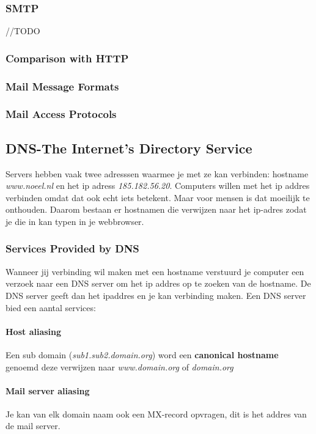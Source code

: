 \subsubsection{SMTP}
//TODO
\subsubsection{Comparison with HTTP}

\subsubsection{Mail Message Formats}

\subsubsection{Mail Access Protocols}

\subsection{DNS-The Internet's Directory Service}
Servers hebben vaak twee adresssen waarmee je met ze kan verbinden: hostname \textit{www.noeel.nl} en het ip adress \textit{185.182.56.20}. Computers willen met het ip addres verbinden omdat dat ook echt iets betekent. Maar voor mensen is dat moeilijk te onthouden. Daarom bestaan er hostnamen die verwijzen naar het ip-adres zodat je die in kan typen in je webbrowser.
\subsubsection{Services Provided by DNS}
Wanneer jij verbinding wil maken met een hostname verstuurd je computer een verzoek naar een DNS server om het ip addres op te zoeken van de hostname. De DNS server geeft dan het ipaddres en je kan verbinding maken.
\newline
Een DNS server bied een aantal services:
\paragraph{Host aliasing}
Een sub domain (\textit{sub1.sub2.domain.org}) word een \textbf{canonical hostname} genoemd deze verwijzen naar \textit{www.domain.org} of \textit{domain.org}
\paragraph{Mail server aliasing}
Je kan van elk domain naam ook een MX-record opvragen, dit is het addres van de mail server.

